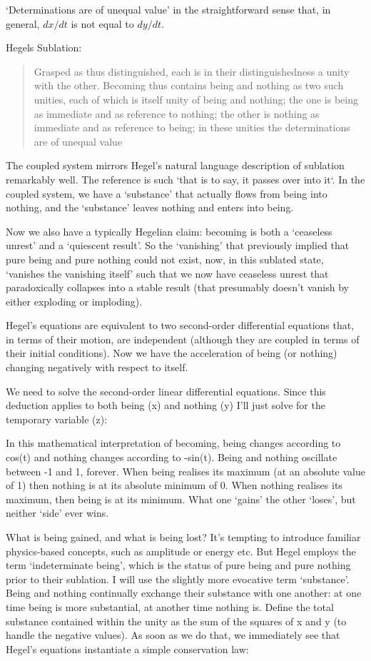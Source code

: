 \documentclass[
]{book}
\begin{document}
`Determinations are of unequal value' in the straightforward sense that, in general,
\(dx/dt\) is not equal to \(dy/dt\).

Hegels Sublation:

\begin{quote}
Grasped as thus distinguished, each is in their distinguishedness a unity with the other. Becoming thus contains being and nothing as two such unities, each of which is itself unity of being and nothing; the one is being as immediate and as reference to nothing; the other is nothing as immediate and as reference to being; in these unities the determinations are of unequal value
\end{quote}

The coupled system mirrors Hegel's natural language description of sublation
remarkably well.
The reference is such `that is to say, it passes over into it`.
In the coupled system, we have a `substance' that actually
flows from being into nothing, and the `substance'
leaves nothing and enters into being.

Now we also have a typically Hegelian claim: becoming is both a `ceaseless unrest' and a `quiescent result'. So the `vanishing' that previously implied that pure being and pure nothing could not exist, now, in this sublated state, `vanishes the vanishing itself' such that we now have ceaseless unrest that paradoxically collapses into a stable result (that presumably doesn't vanish by either exploding or imploding).

Hegel's equations are equivalent to two second-order differential equations that, in terms of their motion, are independent (although they are coupled in terms of their initial conditions).
Now we have the acceleration of being (or nothing) changing negatively with respect to itself.

We need to solve the second-order linear differential equations. Since this deduction applies to both being (x) and nothing (y) I'll just solve for the temporary variable (z):

In this mathematical interpretation of becoming, being changes according to cos(t) and nothing changes according to -sin(t).
Being and nothing oscillate between -1 and 1, forever.
When being realises its maximum (at an absolute value of 1) then nothing is at its absolute minimum of 0. When nothing realises its maximum, then being is at its minimum. What one `gains' the other `loses', but neither `side' ever wins.

What is being gained, and what is being lost? It's tempting to introduce familiar physics-based concepts, such as amplitude or energy etc. But Hegel employs the term `indeterminate being', which is the status of pure being and pure nothing prior to their sublation. I will use the slightly more evocative term `substance'. Being and nothing continually exchange their substance with one another: at one time being is more substantial, at another time nothing is. Define the total substance contained within the unity as the sum of the squares of x and y (to handle the negative values). As soon as we do that, we immediately see that Hegel's equations instantiate a simple conservation law:
\end{document}
